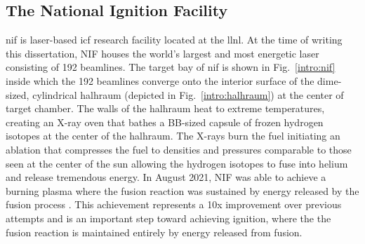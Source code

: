 \documentclass[../doc.tex]{subfiles}
\begin{document}
\subsection{The National Ignition Facility}
\gls{nif} is laser-based \gls{icf} research facility located at the \gls{llnl}. At the time of writing this dissertation, NIF houses the world's largest and most energetic laser consisting of 192 beamlines. The target bay of \gls{nif} is shown in Fig.~\ref{intro:nif} inside which the 192 beamlines converge onto the interior surface of the dime-sized, cylindrical halhraum (depicted in Fig.~\ref{intro:halhraum}) at the center of target chamber. The walls of the halhraum heat to extreme temperatures, creating an X-ray oven that bathes a BB-sized capsule of frozen hydrogen isotopes at the center of the halhraum. The X-rays burn the fuel initiating an ablation that compresses the fuel to densities and pressures comparable to those seen at the center of the sun allowing the hydrogen isotopes to fuse into helium and release tremendous energy. In August 2021, NIF was able to achieve a burning plasma where the fusion reaction was sustained by energy released by the fusion process \cite{Zylstra2022}. This achievement represents a 10x improvement over previous attempts and is an important step toward achieving ignition, where the the fusion reaction is maintained entirely by energy released from fusion. 
\end{document}
